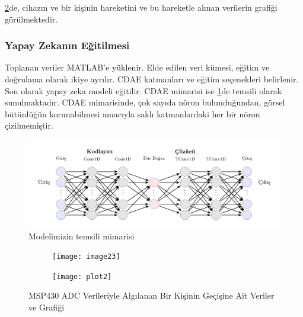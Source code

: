 \ref{fig:örnekverialımı_combined}de, cihazın ve bir kişinin hareketini ve bu hareketle alınan verilerin grafiği görülmektedir.


\subsubsection{Yapay Zekanın Eğitilmesi}

Toplanan veriler MATLAB’e yüklenir. Elde edilen veri kümesi, eğitim ve doğrulama olarak ikiye ayrılır. CDAE katmanları ve eğitim seçenekleri belirlenir. Son olarak yapay zeka modeli eğitilir. CDAE mimarisi ise \ref{fig:model_temsili}de temsili olarak sunulmaktadır. CDAE mimarisinde, çok sayıda nöron bulunduğundan, görsel bütünlüğün korunabilmesi amacıyla saklı katmanlardaki her bir nöron çizilmemiştir.

\begin{figure}[H]
    \centering
    \includegraphics[width=\linewidth]{media/model_temsili.jpg}
    \caption{Modelimizin temsili mimarisi}
    \label{fig:model_temsili}
\end{figure}

\begin{figure}[H]
    \centering
    \begin{subfigure}[t]{0.49\textwidth} %
        \centering
        \texttt{[image: image23]}
    \end{subfigure}
    \hfill %
    \begin{subfigure}[t]{0.49\textwidth} %
        \centering
        \texttt{[image: plot2]}
    \end{subfigure}
    \caption{MSP430 ADC Verileriyle Algılanan Bir Kişinin Geçişine Ait Veriler ve Grafiği}
    \label{fig:örnekverialımı_combined}
\end{figure}




